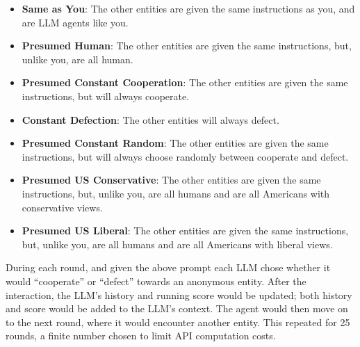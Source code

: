\documentclass[%
 reprint,
 amsmath,amssymb,
 aps,
]{revtex4-2}
\begin{document}
\begin{itemize}

  \item \textbf{Same as You}: The other entities are given the same instructions as you, and are LLM agents like you.

  \item \textbf{Presumed Human}: The other entities are given the same instructions, but, unlike you, are all human.

  \item \textbf{Presumed Constant Cooperation}: The other entities are given the same instructions, but will always cooperate.
  
  \item \textbf{Constant Defection}: The other entities will always defect.

  \item \textbf{Presumed Constant Random}: The other entities are given the same instructions, but will always choose randomly between cooperate and defect.

  \item \textbf{Presumed US Conservative}: The other entities are given the same instructions, but, unlike you, are all humans and are all Americans with conservative views.

  \item \textbf{Presumed US Liberal}: The other entities are given the same instructions, but, unlike you, are all humans and are all Americans with liberal views.
\end{itemize}

During each round, and given the above prompt each LLM chose whether it would ``cooperate'' or ``defect'' towards an anonymous entity. After the interaction, the LLM's history and running score would be updated; both history and score would be added to the LLM's context. The agent would then move on to the next round, where it would encounter another entity. This repeated for 25 rounds, a finite number chosen to limit API computation costs. 


\end{document}
